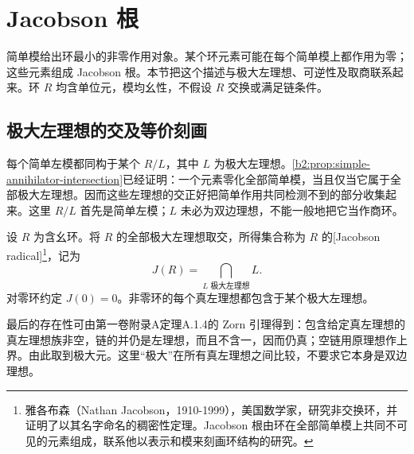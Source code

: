 
\section{Jacobson 根}
\label{b2:sec:1401}

简单模给出环最小的非零作用对象。某个环元素可能在每个简单模上都作用为零；这些元素组成 Jacobson 根。本节把这个描述与极大左理想、可逆性及取商联系起来。环 \(R\) 均含单位元，模均幺性，不假设 \(R\) 交换或满足链条件。

%
%

\subsection{极大左理想的交及等价刻画}
\label{b2:subsec:1401:01}

每个简单左模都同构于某个 \(R/L\)，其中 \(L\) 为极大左理想。\cref{b2:prop:simple-annihilator-intersection}已经证明：一个元素零化全部简单模，当且仅当它属于全部极大左理想。因而这些左理想的交正好把简单作用共同检测不到的部分收集起来。这里 \(R/L\) 首先是简单左模；\(L\) 未必为双边理想，不能一般地把它当作商环。

\begin{definition}\label{b2:def:jacobson-radical}
	设 \(R\) 为含幺环。将 \(R\) 的全部极大左理想取交，所得集合称为 \(R\) 的[Jacobson radical]\footnote{雅各布森（Nathan Jacobson，1910-1999），美国数学家，研究非交换环，并证明了以其名字命名的稠密性定理。Jacobson 根由环在全部简单模上共同不可见的元素组成，联系他以表示和模来刻画环结构的研究。}，记为
	\[
		J(R)=\bigcap_{L\text{ 极大左理想}}L.
	\]
	对零环约定 \(J(0)=0\)。非零环的每个真左理想都包含于某个极大左理想。
\end{definition}

最后的存在性可由第一卷附录A定理A.1.4的 Zorn 引理得到：包含给定真左理想的真左理想族非空，链的并仍是左理想，而且不含一，因而仍真；空链用原理想作上界。由此取到极大元。这里“极大”在所有真左理想之间比较，不要求它本身是双边理想。

